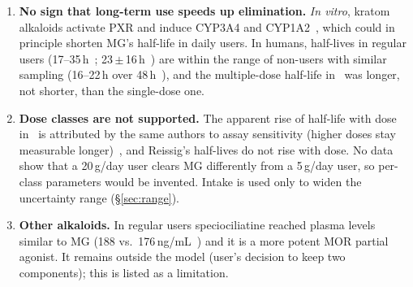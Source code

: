 \documentclass[10pt,a4paper]{article}
\begin{document}
\begin{enumerate}
samples~\cite{kanumuri2026}, so earlier 7-OH values may be underestimates.
\item \textbf{No sign that long-term use speeds up elimination.} \emph{In vitro}, kratom alkaloids activate PXR and induce CYP3A4 and CYP1A2~\cite{manda2017},
which could in principle shorten MG's half-life in daily users. In humans, half-lives in regular users (17--35\,h~\cite{kanumuri2026};
23\,$\pm$\,16\,h~\cite{trak2015}) are within the range of non-users with similar sampling (16--22\,h over 48\,h~\cite{reissig2026}), and the
multiple-dose half-life in~\cite{huestis2024} was longer, not shorter, than the single-dose one.
\item \textbf{Dose classes are not supported.} The apparent rise of half-life with dose in~\cite{huestis2024} is attributed by the same authors to
assay sensitivity (higher doses stay measurable longer)~\cite{huestis2026}, and Reissig's half-lives do not rise with dose. No data show that a
20\,g/day user clears MG differently from a 5\,g/day user, so per-class parameters would be invented. Intake is used only to widen the
uncertainty range (\S\ref{sec:range}).
\item \textbf{Other alkaloids.} In regular users speciociliatine reached plasma levels similar to MG (188 vs.\ 176\,ng/mL~\cite{smith2024}) and
it is a more potent MOR partial agonist. It remains outside the model (user's decision to keep two components); this is listed as a limitation.
\end{enumerate}
\end{document}

